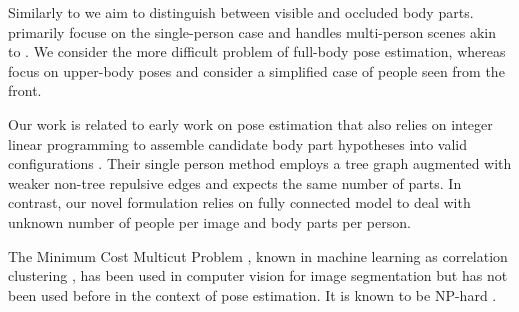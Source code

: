Similarly to \cite{Chen:2015:POC} we aim to distinguish between
visible and occluded body parts. \cite{Chen:2015:POC} primarily
focuse on the single-person case and handles multi-person scenes
akin to \cite{yang12pami}. 
We consider the
 more difficult problem of full-body pose estimation,
whereas \cite{eichner10eccv,Chen:2015:POC} focus on upper-body poses
and consider a simplified case of people seen from the front.

Our work is related to early work on pose estimation that also relies
on integer linear programming to assemble candidate body part
hypotheses into valid configurations \cite{Jiang:2008:GPE}. Their
single person method employs a tree graph augmented with weaker
non-tree repulsive edges and expects the same number of parts. In
contrast, our novel formulation relies on fully connected model
to deal with unknown number of people per image and body parts per
person.

The Minimum Cost Multicut Problem
\cite{chopra-1993,deza-1997},
known in machine learning as correlation clustering
\cite{bansal-2004},
has been used in computer vision for image segmentation 
\cite{alush-2012,andres-2011,kim-2014,yarkony-2012}
but has not been used before in the context of pose estimation.
It is known to be NP-hard
\cite{demaine-2006}.







